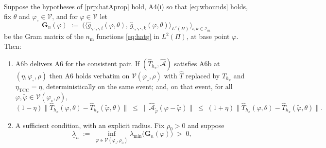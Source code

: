 \begin{proposition}\label{prp:tccrepair}
Suppose the hypotheses of \cref{prp:hatAprop} hold, A4(i) so that \eqref{eq:wbounds} holds, fix $\theta$
and $\varphi_\circ\in\mathcal V$, and
for $\varphi\in\mathcal V$ let
\begin{equation}\label{eq:gram}
\mathbf G_n(\varphi)\;:=\;\Big(\big\langle \hat g_{\cdot,\cdot,\cdot,i}(\varphi,\theta),\,
\hat g_{\cdot,\cdot,\cdot,k}(\varphi,\theta)\big\rangle_{L^{2}(\Pi)}\Big)_{i,k\in\mathcal I_m}
\end{equation}
be the Gram matrix of the $n_{\mathrm m}$ functions \eqref{eq:hatg} in $L^{2}(\Pi)$, at base point
$\varphi$. Then:
\begin{enumerate}
\item[(i)] A6b delivers A6 for the consistent pair. If $(\hat T_{h_x},\hat{\mathcal A})$
satisfies A6b at $(\eta,\varphi_\circ,\rho)$ then A6 holds verbatim on
$\mathcal V(\varphi_\circ,\rho)$ with $\hat T$ replaced by $\hat T_{h_x}$ and
$\eta_{\mathrm{TCC}}=\eta$, deterministically on the same event; and, on that event, for all
$\varphi,\tilde\varphi\in\mathcal V(\varphi_\circ,\rho)$,
\[
(1-\eta)\big\|\hat T_{h_x}(\varphi,\theta)-\hat T_{h_x}(\tilde\varphi,\theta)\big\|
\;\le\;\big\|\hat{\mathcal A}_{\tilde\varphi}(\varphi-\tilde\varphi)\big\|
\;\le\;(1+\eta)\big\|\hat T_{h_x}(\varphi,\theta)-\hat T_{h_x}(\tilde\varphi,\theta)\big\| .
\]
\item[(ii)] A sufficient condition, with an explicit radius. Fix $\rho_0>0$ and suppose
\begin{equation}\label{eq:gramunif}
\underline\lambda_n\;:=\;\inf_{\varphi\in\mathcal V(\varphi_\circ,\rho_0)}
\lambda_{\min}\big(\mathbf G_n(\varphi)\big)\;>\;0 ,

\end{equation}
\end{enumerate}
\end{proposition}

